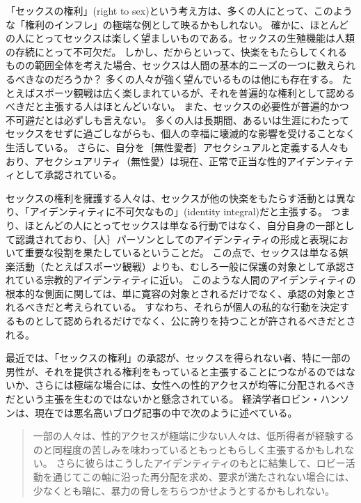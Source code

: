 \documentclass[paper=a4,book,openany]{jlreq}
\begin{document}
「セックスの権利」(right to sex)という考え方は、多くの人にとって、このような「権利のインフレ」の極端な例として映るかもしれない。
確かに、ほとんどの人にとってセックスは楽しく望ましいものである。セックスの生殖機能は人類の存続にとって不可欠だ。
しかし、だからといって、快楽をもたらしてくれるものの範囲全体を考えた場合、セックスは人間の基本的ニーズの一つに数えられるべきなのだろうか？  多くの人々が強く望んでいるものは他にも存在する。
たとえばスポーツ観戦は広く楽しまれているが、それを普遍的な権利として認めるべきだと主張する人はほとんどいない。
また、セックスの必要性が普遍的かつ不可避だとは必ずしも言えない。
多くの人は長期間、あるいは生涯にわたってセックスをせずに過ごしながらも、個人の幸福に壊滅的な影響を受けることなく生活している。
さらに、自分を｛無性愛者｝{アセクシュアル}と定義する人々もおり、アセクシュアリティ（無性愛）は現在、正常で正当な性的アイデンティティとして承認されている。

セックスの権利を擁護する人々は、セックスが他の快楽をもたらす活動とは異なり、「アイデンティティに不可欠なもの」(identity integral)だと主張する。
つまり、ほとんどの人にとってセックスは単なる行動ではなく、自分自身の一部として認識されており、｛人｝{パーソン}としてのアイデンティティの形成と表現において重要な役割を果たしているということだ。
この点で、セックスは単なる娯楽活動（たとえばスポーツ観戦）よりも、むしろ一般に保護の対象として承認されている宗教的アイデンティティに近い。
このような人間のアイデンティティの根本的な側面に関しては、単に寛容の対象とされるだけでなく、承認の対象とされるべきだと考えられている。
すなわち、それらが個人の私的な行動を決定するものとして認められるだけでなく、公に誇りを持つことが許されるべきだとされる。

最近では、「セックスの権利」の承認が、セックスを得られない者、特に一部の男性が、それを提供される権利をもっていると主張することにつながるのではないか、さらには極端な場合には、女性への性的アクセスが均等に分配されるべきだという主張を生むのではないかと懸念されている。
経済学者ロビン・ハンソンは、現在では悪名高いブログ記事の中で次のように述べている。

\begin{quote}
一部の人々は、性的アクセスが極端に少ない人々は、低所得者が経験するのと同程度の苦しみを味わっているともっともらしく主張するかもしれない。
さらに彼らはこうしたアイデンティティのもとに結集して、ロビー活動を通じてこの軸に沿った再分配を求め、要求が満たされない場合には、少なくとも暗に、暴力の脅しをちらつかせようとするかもしれない。
\citep{hanson18:_two_types_envy}
\end{quote}
\end{document}
